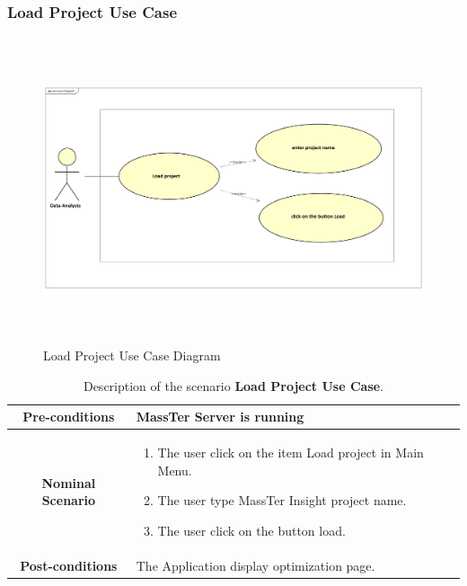 	 \subsubsection{Load Project Use Case}
	 	\begin{figure}[h]
	\centering
	\includegraphics[width=16.5cm,height=9cm]{loadProject.png}
	\caption{Load Project Use Case Diagram}
	
	\end{figure}
 
  \begin{table}
  	\caption{Description of the scenario \textbf{Load Project Use Case}.}
  	\label{DSTabLP}
 	\centering
 	\begin{tabular}{|c|p{10cm}|}
 		\hline 	
 		\textbf{Pre-conditions } & MassTer Server is running \\ 
 		\hline                     
 		\textbf{Nominal Scenario } & \begin{enumerate}
 			\item The user click on the item Load project in Main Menu.
 			\item The user type MassTer Insight project name.
 			\item The user click on the button load. 
 		\end{enumerate} \\ 
 		\hline 
 		\textbf{Post-conditions} & The Application display optimization page. \\
 		\hline 
 	\end{tabular}
 \end{table}

